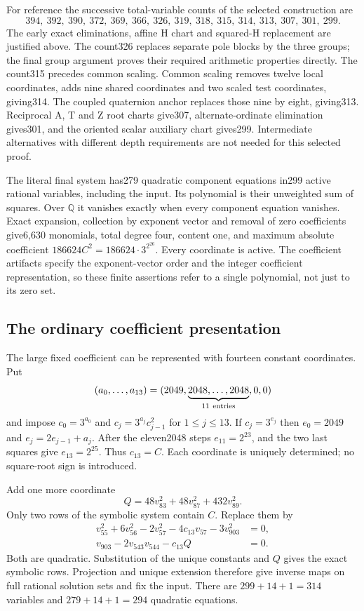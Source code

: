 For reference the successive total-variable counts of the
selected construction are
\[
394,\ 392,\ 390,\ 372,\ 369,\ 366,\ 326,\ 319,\
318,\ 315,\ 314,\ 313,\ 307,\ 301,\ 299 .
\]
The early exact eliminations, affine H chart and squared-H
replacement are justified above. The count326 replaces
separate pole blocks by the three groups; the final group
argument proves their required arithmetic properties
directly. The count315 precedes common scaling.
Common scaling removes twelve local coordinates, adds nine
shared coordinates and two scaled test coordinates, giving314.
The coupled quaternion anchor replaces those nine by eight,
giving313. Reciprocal A, T and Z root charts give307,
alternate-ordinate elimination gives301, and the oriented
scalar auxiliary chart gives299.
Intermediate alternatives with different depth requirements
are not needed for this selected proof.

The literal final system has279 quadratic component
equations in299 active rational variables, including the
input. Its polynomial is their unweighted sum of squares.
Over $\mathbb Q$ it vanishes exactly when every component
equation vanishes. Exact expansion, collection by exponent
vector and removal of zero coefficients give6,630 monomials,
total degree four, content one, and maximum absolute
coefficient $186624C^2=186624\cdot3^{2^{26}}$.
Every coordinate is active. The coefficient artifacts specify
the exponent-vector order and the integer coefficient
representation, so these finite assertions refer to a
single polynomial, not just to its zero set.

\subsection{The ordinary coefficient presentation}
\label{subsec:v14-ordinary}
The large fixed coefficient can be represented with fourteen
constant coordinates. Put
\[
 (a_0,\ldots,a_{13})=(2049,
 \underbrace{2048,\ldots,2048}_{11\ {\rm entries}},0,0)
\]
and impose
$c_0=3^{a_0}$ and $c_j=3^{a_j}c_{j-1}^2$ for $1\leq j\leq13$.
If $c_j=3^{e_j}$ then
$e_0=2049$ and $e_j=2e_{j-1}+a_j$.
After the eleven2048 steps $e_{11}=2^{23}$, and the two
last squares give $e_{13}=2^{25}$. Thus $c_{13}=C$.
Each coordinate is uniquely determined; no square-root sign
is introduced.

Add one more coordinate
\[
 Q=48v_{83}^2+48v_{87}^2+432v_{89}^2.
\]
Only two rows of the symbolic system contain $C$. Replace
them by
\[
\begin{split}
 v_{55}^2+6v_{56}^2-2v_{57}^2
       -4c_{13}v_{57}-3v_{903}^2&=0,\\
 v_{903}-2v_{543}v_{544}-c_{13}Q&=0 .
\end{split}
\]
Both are quadratic. Substitution of the unique constants
and $Q$ gives the exact symbolic rows. Projection and unique
extension therefore give inverse maps on full rational
solution sets and fix the input.
There are $299+14+1=314$ variables and $279+14+1=294$
quadratic equations.

